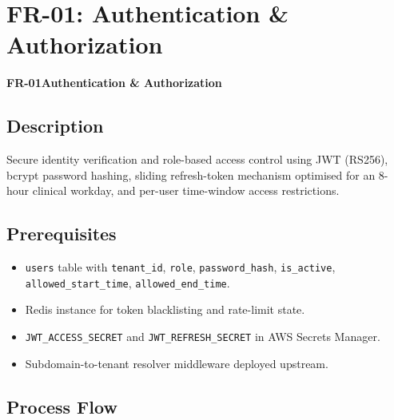 \documentclass[12pt,a4paper]{report}
\newcommand{\moduleheader}[2]{%
  \par\vspace{6pt}%
  \noindent\colorbox{branddark}{\color{white}\textbf{\small #1}}\quad\textbf{\large #2}%
  \par\vspace{4pt}%
}
\begin{document}
\chapter{FR-01: Authentication \& Authorization}

\moduleheader{FR-01}{Authentication \& Authorization}

\section{Description}

Secure identity verification and role-based access control using JWT (RS256), bcrypt password hashing, sliding refresh-token mechanism optimised for an 8-hour clinical workday, and per-user time-window access restrictions.

\section{Prerequisites}

\begin{itemize}
  \item \texttt{users} table with \texttt{tenant\_id}, \texttt{role}, \texttt{password\_hash}, \texttt{is\_active}, \texttt{allowed\_start\_time}, \texttt{allowed\_end\_time}.
  \item Redis instance for token blacklisting and rate-limit state.
  \item \texttt{JWT\_ACCESS\_SECRET} and \texttt{JWT\_REFRESH\_SECRET} in AWS Secrets Manager.
  \item Subdomain-to-tenant resolver middleware deployed upstream.
\end{itemize}

\section{Process Flow}
\end{document}
